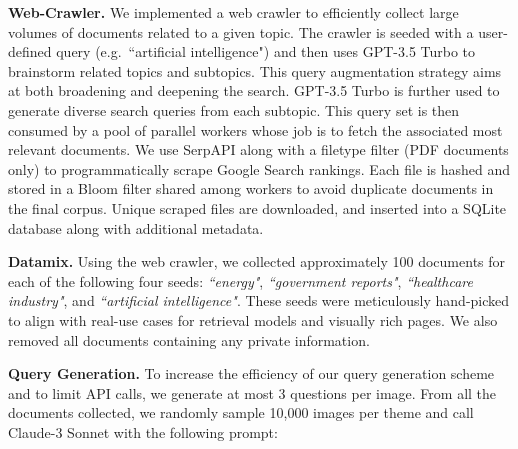 \noindent\textbf{Web-Crawler.} We implemented a web crawler to efficiently collect large volumes of documents related to a given topic. The crawler is seeded with a user-defined query (e.g.\ ``artificial intelligence") and then uses GPT-3.5 Turbo to brainstorm related topics and subtopics. This query augmentation strategy aims at both broadening and deepening the search. GPT-3.5 Turbo is further used to generate diverse search queries from each subtopic. This query set is then consumed by a pool of parallel workers whose job is to fetch the associated most relevant documents. We use SerpAPI along with a filetype filter (PDF documents only) to programmatically scrape Google Search rankings. Each file is hashed and stored in a Bloom filter  shared among workers to avoid duplicate documents in the final corpus. Unique scraped files are downloaded, and inserted into a SQLite database along with additional metadata.

\noindent\textbf{Datamix.} Using the web crawler, we collected approximately 100 documents for each of the following four seeds: \textit{``energy"}, \textit{``government reports"}, \textit{``healthcare industry"}, and \textit{``artificial intelligence"}. These seeds were meticulously hand-picked to align with real-use cases for retrieval models and visually rich pages. We also removed all documents containing any private information. 

\noindent\textbf{Query Generation.}\label{paragraph:query_generation} To increase the efficiency of our query generation scheme and to limit API calls, we generate at most 3 questions per image. From all the documents collected, we randomly sample 10,000 images per theme and call Claude-3 Sonnet with the following prompt:


